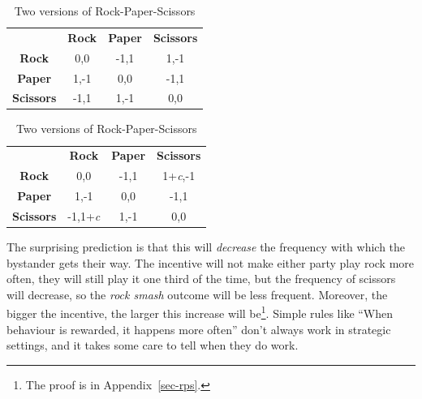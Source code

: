 \documentclass[
  12pt,
  letterpaper,
  DIV=11,
  numbers=noendperiod]{scrreprt}
\begin{document}
\begin{table}

\caption{\label{tbl-rps}Two versions of
Rock-Paper-Scissors}\begin{minipage}[t]{0.50\linewidth}

{\centering 

\begin{tabular}[t]{cccc}
\toprule
 & \textbf{Rock} & \textbf{Paper} & \textbf{Scissors}\\
\textbf{Rock} & 0,0 & -1,1 & 1,-1\\
\textbf{Paper} & 1,-1 & 0,0 & -1,1\\
\textbf{Scissors} & -1,1 & 1,-1 & 0,0\\
\bottomrule
\end{tabular}

}

\end{minipage}%
%
\begin{minipage}[t]{0.50\linewidth}

{\centering 

\begin{tabular}[t]{cccc}
\toprule
 & \textbf{Rock} & \textbf{Paper} & \textbf{Scissors}\\
\textbf{Rock} & 0,0 & -1,1 & 1+\emph{c},-1\\
\textbf{Paper} & 1,-1 & 0,0 & -1,1\\
\textbf{Scissors} & -1,1+\emph{c} & 1,-1 & 0,0\\
\bottomrule
\end{tabular}

}

\end{minipage}%

\end{table}

The surprising prediction is that this will \emph{decrease} the
frequency with which the bystander gets their way. The incentive will
not make either party play rock more often, they will still play it one
third of the time, but the frequency of scissors will decrease, so the
\emph{rock smash} outcome will be less frequent. Moreover, the bigger
the incentive, the larger this increase will be\footnote{The proof is in
  Appendix~\ref{sec-rps}.}. Simple rules like ``When behaviour is
rewarded, it happens more often'' don't always work in strategic
settings, and it takes some care to tell when they do work.
\end{document}
